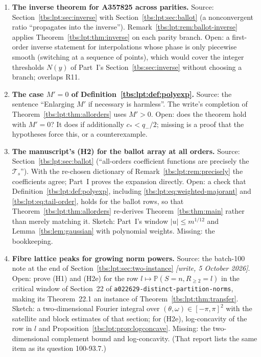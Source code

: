 \documentclass[11pt,a4paper]{article}
\numberwithin{equation}{section}
\theoremstyle{definition}
\begin{document}
\begin{enumerate}[label=\textbf{F\arabic*.},leftmargin=*]
the last, a theorem deriving a logistic law near ties from a
supercritical lattice-peak hypothesis, of which Part~I's
Corollary~\ref{tbs:cor:logistic} would be an instance. Missing: any such
statement.
\item \textbf{The inverse theorem for A357825 across parities.} Source:
Section~\ref{tbs:lpt:sec:inverse} with Section~\ref{tbs:lpt:sec:ballot}
(a nonconvergent ratio ``propagates into the inverse'').
Remark~\ref{tbs:lpt:rem:ballot-inverse} applies
Theorem~\ref{tbs:lpt:thm:inverse} on each parity branch. Open: a
first-order inverse statement for interpolations whose phase is only
piecewise smooth (switching at a sequence of points), which would cover
the integer thresholds $N(y)$ of Part~I's Section~\ref{tbs:sec:inverse}
without choosing a branch; overlaps R11.
\item \textbf{The case $M'=0$ of Definition~\ref{tbs:lpt:def:polyexp}.}
Source: the sentence ``Enlarging $M'$ if necessary is harmless''. The
write's completion of Theorem~\ref{tbs:lpt:thm:allorders} uses $M'>0$.
Open: does the theorem hold with $M'=0$? It does if additionally
$c_*<q_-/2$; missing is a proof that the hypotheses force this, or a
counterexample.
\item \textbf{The manuscript's (H2) for the ballot array at all orders.}
Source: Section~\ref{tbs:lpt:sec:ballot} (``all-orders coefficient
functions are precisely the $\mathcal T_s$''). With the re-chosen
dictionary of Remark~\ref{tbs:lpt:rem:precisely} the coefficients agree;
Part~I proves the expansion directly. Open: a check that
Definition~\ref{tbs:lpt:def:polyexp}, including
\eqref{tbs:lpt:eq:weighted-majorant} and \eqref{tbs:lpt:eq:tail-order},
holds for the ballot rows, so that Theorem~\ref{tbs:lpt:thm:allorders}
re-derives Theorem~\ref{tbs:thm:main} rather than merely matching it.
Sketch: Part~I's window $|u|\le m^{1/12}$ and
Lemma~\ref{tbs:lem:gaussian} with polynomial weights. Missing: the
bookkeeping.
\item \textbf{Fibre lattice peaks for growing norm powers.} Source: the
batch-100 note at the end of Section~\ref{tbs:lpt:sec:two-instance}
\emph{[write, 5 October 2026]}. Open: prove (H1) and (H2e) for the row
$l\mapsto\mathbb P(S=n,R_{\ge2}=l)$ in the critical window of Section~22 of
\nolinkurl{a022629-distinct-partition-norms}, making its Theorem~22.1 an
instance of Theorem~\ref{tbs:lpt:thm:transfer}. Sketch: a two-dimensional
Fourier integral over $(\theta,\omega)\in[-\pi,\pi]^2$ with the satellite and
block estimates of that section; for (H2e), log-concavity of the row in $l$
and Proposition~\ref{tbs:lpt:prop:logconcave}. Missing: the two-dimensional
complement bound and log-concavity. (That report lists the same item as its
question 100-93.7.)
\end{enumerate}
\end{document}
